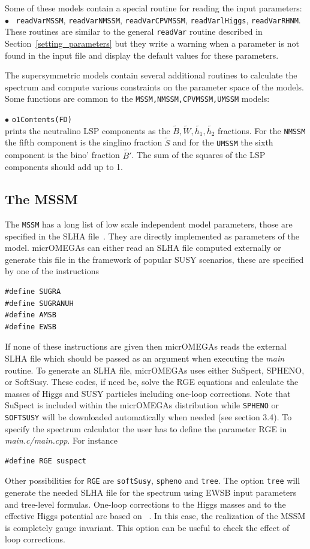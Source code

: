 \documentclass[12pt,a4paper]{article}
\begin{document}
Some of these models contain a special routine for reading the input parameters:\\
$\bullet$ \verb| readVarMSSM|, \verb|readVarNMSSM|,  \verb|readVarCPVMSSM|,
\verb|readVarlHiggs|, \verb|readVarRHNM|.\\
 These routines  are similar to the general 
\verb|readVar| routine described  in Section~\ref{setting_parameters}
but  they write a warning when a parameter is not found in the 
input file and display the default values for these parameters.

The supersymmetric models contain several additional routines to calculate the spectrum
and compute various constraints on the parameter space of the models. Some functions are
common to the \verb|MSSM,NMSSM,CPVMSSM,UMSSM| models: 


\noindent
$\bullet$  \verb|o1Contents(FD)|\\
prints  the neutralino LSP components as the  $\tilde{B},\tilde{W},
\tilde{h_1},\tilde{h_2}$ fractions. For the {\tt NMSSM} the fifth component is
the singlino fraction  $\tilde{S}$ and for the {\tt UMSSM} the sixth component is
the bino' fraction  $\tilde{B'}$. The sum of the squares of the LSP components
should add up to 1. 



\subsection{The MSSM}
The {\tt MSSM} has a long list of low scale  independent model 
parameters, those are specified in the SLHA file~\cite{Skands:2003cj,Allanach:2008qq}.
They are directly implemented as parameters of the model.
micrOMEGAs can either read an SLHA file computed externally or
generate  this file in the  framework of  popular  SUSY scenarios, these are specified by one of the instructions
\begin{verbatim}
#define SUGRA
#define SUGRANUH
#define AMSB 
#define EWSB
\end{verbatim}  
If none of these instructions are given then micrOMEGAs reads the external SLHA file which should be passed as an argument  when executing the {\it main} routine. 
To generate  an SLHA file,  micrOMEGAs uses either SuSpect, SPHENO, or SoftSusy. These codes, if need be, solve the RGE equations and calculate the masses of Higgs and SUSY particles including one-loop corrections.  Note that SuSpect  is included within the micrOMEGAs distribution while  {\tt SPHENO} or {\tt SOFTSUSY} will be downloaded automatically when needed (see section 3.4).
To specify  the spectrum calculator  the user has to define the parameter RGE  in {\it main.c/main.cpp}. For instance
\begin{verbatim}
#define RGE suspect
\end{verbatim}  
Other possibilities for \verb|RGE| are  \verb|softSusy|, \verb|spheno| and \verb|tree|. The option \verb|tree| will generate the needed SLHA file for the spectrum  using  EWSB input parameters and tree-level formulas. One-loop corrections to the Higgs masses and to the effective Higgs potential are based on ~\cite{Carena:1995wu}. In this case, the realization of the MSSM is  completely gauge invariant. This option can be useful to check the 
effect of loop corrections.    
\end{document}
